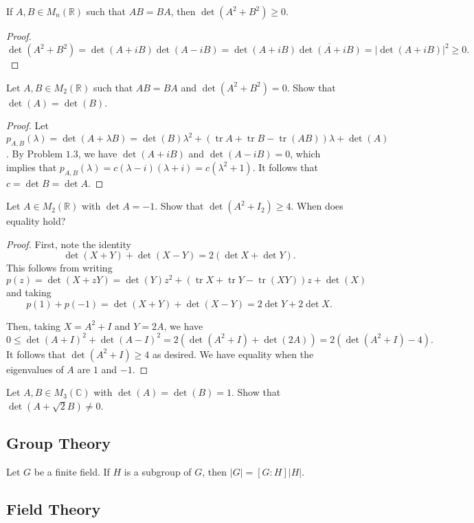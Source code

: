 \documentclass[11pt]{article}
\newcommand{\R}{\mathbb{R}}
\newcommand{\C}{\mathbb C}
\renewcommand{\>}{\rangle}
\newcommand{\<}{\langle}
\newcommand{\tr}{\operatorname{tr}}
\let \ol \overline
\begin{document}
\begin{problem} If $A, B \in M_n(\R)$ such that $AB = BA$, then $\det(A^2 + B^2) \ge 0$.
\end{problem}
\begin{proof}
$$\det(A^2 + B^2) = \det(A+iB)\det(A - iB) = \det(A + iB) \ol{\det(A + iB)} = |\det(A + iB)|^2\ge 0.$$
\end{proof}
\begin{problem} Let $A, B \in M_2(\R)$ such that $AB = BA$ and $\det(A^2 + B^2) = 0$.  Show that $\det(A) = \det(B)$.
\end{problem}
\begin{proof}
Let $p_{A, B}(\lambda) = \det(A + \lambda B) = \det(B) \lambda^2 + (\tr A + \tr B - \tr(AB)) \lambda + \det(A)$.  By Problem $1.3$, we have $\det(A + iB)$ and $\det(A-iB) = 0$, which implies that $p_{A, B}(\lambda) = c(\lambda - i)(\lambda + i) = c(\lambda^2 + 1)$.  It follows that $c = \det B = \det A$.
\end{proof}

\begin{problem} Let $A \in M_2(\R)$ with $\det A = -1$.  Show that $\det(A^2 + I_2) \ge 4$.  When does equality hold?
\end{problem}
\begin{proof}
First, note the identity 
$$\det(X+Y) + \det(X - Y) = 2(\det X+ \det Y).$$
This follows from writing $p(z) = \det(X + zY) = \det(Y) z^2 + (\tr X + \tr Y - \tr(XY)) z + \det(X)$ and taking 
$$p(1) + p(-1) = \det(X+Y) + \det(X - Y) = 2\det Y + 2 \det X.$$

Then, taking $X = A^2 + I$ and $Y = 2A$, we have 
$$0 \le  \det(A + I)^2 + \det(A - I)^2 = 2(\det(A^2 + I) + \det(2A)) = 2(\det(A^2 + I) - 4).$$
It follows that $\det(A^2 + I) \ge 4$ as desired.  We have equality when the eigenvalues of $A$ are $1$ and $-1$.  
\end{proof}

\begin{problem} Let $A, B \in M_3(\C)$ with $\det(A) = \det(B) = 1$.  Show that $\det(A + \sqrt{2} B) \ne 0$.
\end{problem}
\subsection{Group Theory}
\begin{theorem} Let $G$ be a finite field.  If $H$ is a subgroup of $G$, then $|G| = [G:H]|H|$.
\end{theorem}
\subsection{Field Theory}
\pagebreak
\end{document}
